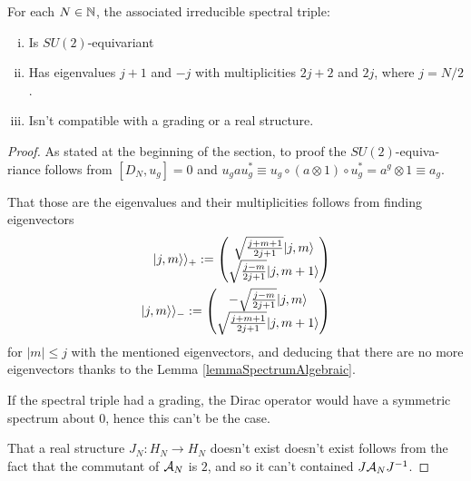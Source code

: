 \begin{proposition}\label{propIrredSpectralTriple}
For each $N \in \mathbb{N}$, the associated irreducible spectral triple:
    \begin{enumerate}[(i)]
        
    \item Is $SU(2)$-equivariant
    
    \item Has eigenvalues $j+1$ and $-j$ with multiplicities $2j+2$ and $2j$, where $j = N/2$.
        
    \item Isn't compatible with a grading or a real structure.
    \end{enumerate}
\end{proposition}

\begin{proof}
As stated at the beginning of the section, to proof the $SU(2)$-equiva- riance follows from $[D_N, u_g] = 0$ and $u_g  a  u_g^* \equiv u_g \circ (a \otimes 1) \circ u_g^* = a^g \otimes 1 \equiv a_g$.

That those are the eigenvalues and their multiplicities follows from finding eigenvectors 
\begin{align}\label{irreducibleDiracFuzzySpinorBasis}
    |j, m \rangle\rangle_+ := 
    \begin{pmatrix} 
    \sqrt{\frac{j+m+1}{2j+1}} |j, m\rangle \\ 
    \sqrt{\frac{j-m}{2j+1}} |j, m+1 \rangle
    \end{pmatrix} \\
    |j, m\rangle\rangle_- := 
    \begin{pmatrix} 
    -\sqrt{\frac{j-m}{2j+1}} |j, m\rangle \\ 
    \sqrt{\frac{j+m+1}{2j+1}} |j, m+1 \rangle
    \end{pmatrix}
\end{align}
for $|m| \leq j$ with the mentioned eigenvectors, and deducing that there are no more eigenvectors thanks to the Lemma \ref{lemmaSpectrumAlgebraic}.

If the spectral triple had a grading, the Dirac operator would have a symmetric spectrum about $0$, hence this can't be the case.

That a real structure $J_N: H_N \to H_N$ doesn't exist doesn't exist follows from the fact that the commutant of $\mathcal A_N$ is $2$, and so it can't contained $J \mathcal A_N J^{-1}$.

\end{proof}



